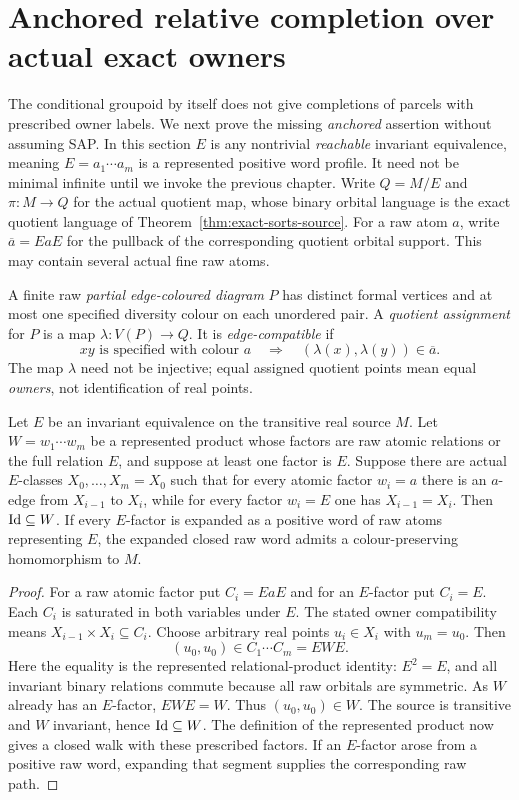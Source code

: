 \section{Anchored relative completion over actual exact owners}
\label{sec:anchored-relative}

The conditional groupoid by itself does not give completions of
parcels with prescribed owner labels.  We next prove the missing
\emph{anchored} assertion without assuming SAP.  In this section
$E$ is any nontrivial \emph{reachable} invariant equivalence, meaning
$E=a_1\cdots a_m$ is a represented positive word profile.  It need
not be minimal infinite until we invoke the previous chapter.
Write $Q=M/E$ and $\pi:M\to Q$ for the actual quotient map, whose
binary orbital language is the exact quotient language of
Theorem~\ref{thm:exact-sorts-source}.  For a raw atom $a$, write
$\overline a=EaE$ for the pullback of the corresponding quotient
orbital support.  This may contain several actual fine raw atoms.

A finite raw \emph{partial edge-coloured diagram} $P$ has distinct
formal vertices and at most one specified diversity colour on each
unordered pair.  A \emph{quotient assignment} for $P$ is a map
$\lambda:V(P)\to Q$.  It is \emph{edge-compatible} if
\[
  xy\text{ is specified with colour }a
  \quad\Longrightarrow\quad
  (\lambda(x),\lambda(y))\in\overline a.
\]
The map $\lambda$ need not be injective; equal assigned quotient
points mean equal \emph{owners}, not identification of real points.

\begin{lemma}
\label{lem:anchored-closed-walk}
Let $E$ be an invariant equivalence on the transitive real source
$M$.  Let $W=w_1\cdots w_m$ be a represented product whose factors
are raw atomic relations or the full relation $E$, and suppose at
least one factor is $E$.  Suppose there are actual $E$-classes
$X_0,\ldots,X_m=X_0$ such that for every atomic factor $w_i=a$
there is an $a$-edge from $X_{i-1}$ to $X_i$, while for every
factor $w_i=E$ one has $X_{i-1}=X_i$.  Then
$\mathrm{Id}\subseteq W$.  If every $E$-factor is expanded as a
positive word of raw atoms representing $E$, the expanded closed
raw word admits a colour-preserving homomorphism to $M$.
\end{lemma}
\begin{proof}
For a raw atomic factor put $C_i=EaE$ and for an $E$-factor put
$C_i=E$.  Each $C_i$ is saturated in both variables under $E$.
The stated owner compatibility means
$X_{i-1}\times X_i\subseteq C_i$.  Choose arbitrary real points
$u_i\in X_i$ with $u_m=u_0$.  Then
\[
 (u_0,u_0)\in C_1\cdots C_m=EWE.
\]
Here the equality is the represented relational-product identity:
$E^2=E$, and all invariant binary relations commute because all
raw orbitals are symmetric.  As $W$ already has an $E$-factor,
$EWE=W$.  Thus $(u_0,u_0)\in W$.  The source is transitive and
$W$ invariant, hence $\mathrm{Id}\subseteq W$.  The definition of the
represented product now gives a closed walk with these prescribed
factors.  If an $E$-factor arose from a positive raw word, expanding
that segment supplies the corresponding raw path.
\end{proof}

